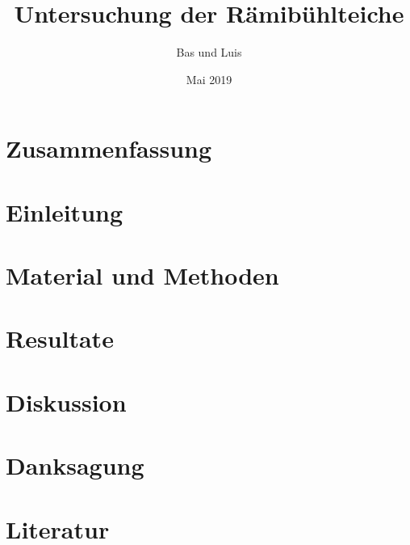 \documentclass{article}
\title{Untersuchung der Rämibühlteiche}
\author{Bas und Luis}
\date{Mai 2019}
\begin{document}
\maketitle

\section{Zusammenfassung}


\section{Einleitung}





\section{Material und Methoden}

\section{Resultate}

\section{Diskussion}

\section{Danksagung}

\section{Literatur}
\end{document}
